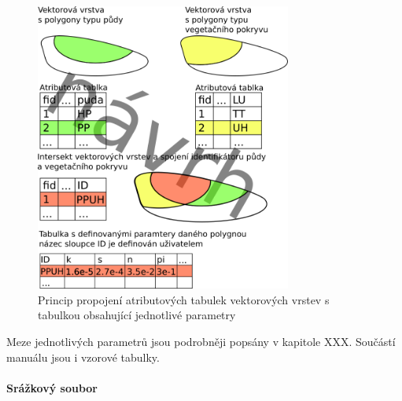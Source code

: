 \begin{figure}
  \centering
  \includegraphics[width=0.75\textwidth]{./img/spojenistabulkou.png}
  \caption{Princip propojení atributových tabulek vektorových vrstev s tabulkou obsahující jednotlivé parametry}
  \label{fig:pripravapar}
\end{figure}


Meze jednotlivých parametrů jsou podrobněji popsány v kapitole XXX. 
Součástí manuálu jsou i vzorové tabulky.



\paragraph{Srážkový soubor} \label{sec:vstupsrazka}

